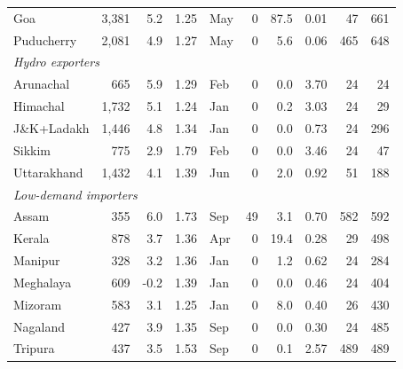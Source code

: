 \begin{tabular}{lrrrlrrrrr}
Goa & 3,381 & 5.2 & 1.25 & May & 0 & 87.5 & 0.01 & 47 & 661\\
Puducherry & 2,081 & 4.9 & 1.27 & May & 0 & 5.6 & 0.06 & 465 & 648\\
\multicolumn{10}{l}{\textit{Hydro exporters}}\\
Arunachal & 665 & 5.9 & 1.29 & Feb & 0 & 0.0 & 3.70 & 24 & 24\\
Himachal & 1,732 & 5.1 & 1.24 & Jan & 0 & 0.2 & 3.03 & 24 & 29\\
J\&K+Ladakh & 1,446 & 4.8 & 1.34 & Jan & 0 & 0.0 & 0.73 & 24 & 296\\
Sikkim & 775 & 2.9 & 1.79 & Feb & 0 & 0.0 & 3.46 & 24 & 47\\
Uttarakhand & 1,432 & 4.1 & 1.39 & Jun & 0 & 2.0 & 0.92 & 51 & 188\\
\multicolumn{10}{l}{\textit{Low-demand importers}}\\
Assam & 355 & 6.0 & 1.73 & Sep & 49 & 3.1 & 0.70 & 582 & 592\\
Kerala & 878 & 3.7 & 1.36 & Apr & 0 & 19.4 & 0.28 & 29 & 498\\
Manipur & 328 & 3.2 & 1.36 & Jan & 0 & 1.2 & 0.62 & 24 & 284\\
Meghalaya & 609 & -0.2 & 1.39 & Jan & 0 & 0.0 & 0.46 & 24 & 404\\
Mizoram & 583 & 3.1 & 1.25 & Jan & 0 & 8.0 & 0.40 & 26 & 430\\
Nagaland & 427 & 3.9 & 1.35 & Sep & 0 & 0.0 & 0.30 & 24 & 485\\
Tripura & 437 & 3.5 & 1.53 & Sep & 0 & 0.1 & 2.57 & 489 & 489\\
\bottomrule
\end{tabular}
